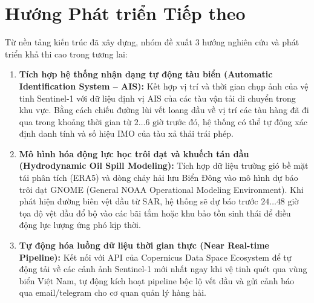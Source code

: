 \section{Hướng Phát triển Tiếp theo}
Từ nền tảng kiến trúc đã xây dựng, nhóm đề xuất 3 hướng nghiên cứu và phát triển khả thi cao trong tương lai:
\begin{enumerate}
    \item \textbf{Tích hợp hệ thống nhận dạng tự động tàu biển (Automatic Identification System -- AIS):}
    Kết hợp vị trí và thời gian chụp ảnh của vệ tinh Sentinel-1 với dữ liệu định vị AIS của các tàu vận tải di chuyển trong khu vực. Bằng cách chiếu đường lùi vết loang dầu về vị trí các tàu hàng đã đi qua trong khoảng thời gian từ $2 \dots 6\text{ giờ}$ trước đó, hệ thống có thể tự động xác định danh tính và số hiệu IMO của tàu xả thải trái phép.
    \item \textbf{Mô hình hóa động lực học trôi dạt và khuếch tán dầu (Hydrodynamic Oil Spill Modeling):}
    Tích hợp dữ liệu trường gió bề mặt tái phân tích (ERA5) và dòng chảy hải lưu Biển Đông vào mô hình dự báo trôi dạt GNOME (General NOAA Operational Modeling Environment). Khi phát hiện đường biên vệt dầu từ SAR, hệ thống sẽ dự báo trước $24 \dots 48\text{ giờ}$ tọa độ vệt dầu đổ bộ vào các bãi tắm hoặc khu bảo tồn sinh thái để điều động lực lượng ứng phó kịp thời.
    \item \textbf{Tự động hóa luồng dữ liệu thời gian thực (Near Real-time Pipeline):}
    Kết nối với API của Copernicus Data Space Ecosystem để tự động tải về các cảnh ảnh Sentinel-1 mới nhất ngay khi vệ tinh quét qua vùng biển Việt Nam, tự động kích hoạt pipeline bộc lộ vết dầu và gửi cảnh báo qua email/telegram cho cơ quan quản lý hàng hải.
\end{enumerate}
